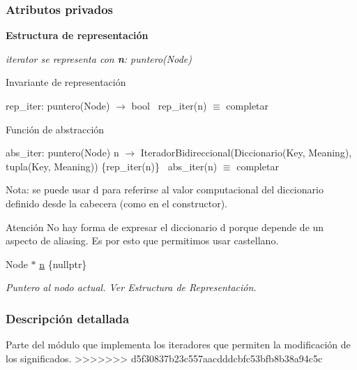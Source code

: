 \subsubsection*{Atributos privados}
\begin{Indent}\textbf{ Estructura de representación}\par
{\em iterator se representa con {\bfseries n}\+: puntero(\+Node)

\begin{DoxyParagraph}{Invariante de representación}

\end{DoxyParagraph}
rep\+\_\+iter\+: puntero(\+Node) $\to$ bool~\newline
rep\+\_\+iter(n) $\equiv$ completar

\begin{DoxyParagraph}{Función de abstracción}

\end{DoxyParagraph}
abs\+\_\+iter\+: puntero(\+Node) n $\to$ Iterador\+Bidireccional(Diccionario(Key, Meaning), tupla(Key, Meaning)) \{rep\+\_\+iter(n)\}~\newline
abs\+\_\+iter(n) $\equiv$ completar

Nota\+: se puede usar {\ttfamily d} para referirse al valor computacional del diccionario definido desde la cabecera (como en el constructor).

\begin{DoxyAttention}{Atención}
No hay forma de expresar el diccionario {\ttfamily d} porque depende de un aspecto de aliasing. Es por esto que permitimos usar castellano. 
\end{DoxyAttention}
}\begin{DoxyCompactItemize}
\item 
Node $\ast$ \hyperlink{classaed2_1_1iterator_1_1iterator_a13e1e7981af004da89fe8feecfb384da_a13e1e7981af004da89fe8feecfb384da}{n} \{nullptr\}
\begin{DoxyCompactList}\small\item\em Puntero al nodo actual. Ver Estructura de Representación. \end{DoxyCompactList}\end{DoxyCompactItemize}
\end{Indent}


\subsubsection{Descripción detallada}
Parte del módulo que implementa los iteradores que permiten la modificación de los significados. 
>>>>>>> d5f30837b23c557aacdddcbfc53bfb8b38a94c5c

